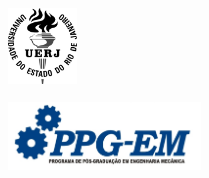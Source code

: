 \thispagestyle{empty}

\begin{minipage}{0.5\linewidth}
\flushleft
\includegraphics[height=20mm]{./figs/logo_uerj_PB.png}
\end{minipage}
\begin{minipage}{0.5\linewidth}
\flushright
\includegraphics[height=18mm]{./figs/logo_ppg-em.jpg}
\end{minipage}

\hrulefill


